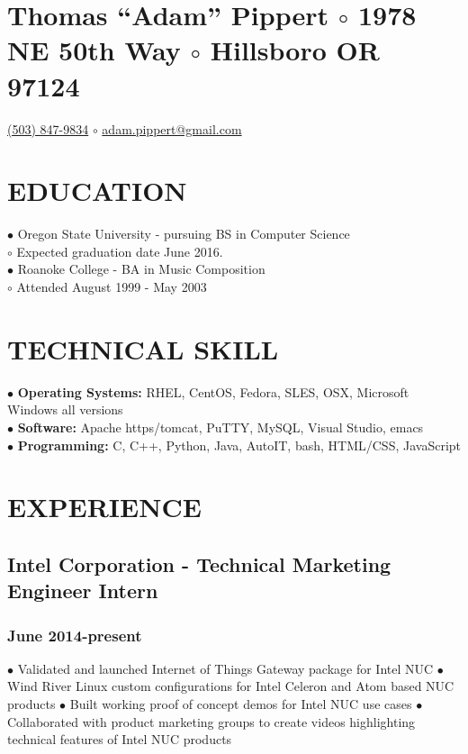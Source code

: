 \documentclass{article}
\begin{document}
\section*{Thomas ``Adam'' Pippert $\circ$
1978 NE 50th Way $\circ$
Hillsboro OR 97124}
\href{tel:+15038479834}{(503) 847-9834} $\circ$
\href{mailto:adam.pippert@gmail.com}{adam.pippert@gmail.com}

\section*{EDUCATION}

$\bullet$ Oregon State University - pursuing BS in Computer Science\\
$  \circ$ Expected graduation date June 2016.\\
$\bullet$ Roanoke College - BA in Music Composition\\
$  \circ$ Attended August 1999 - May 2003\\

\section*{TECHNICAL SKILL}

$\bullet$ \textbf{Operating Systems:} RHEL, CentOS, Fedora, SLES, OSX, Microsoft Windows all versions\\
$\bullet$ \textbf{Software:} Apache https/tomcat, PuTTY, MySQL, Visual Studio, emacs\\
$\bullet$ \textbf{Programming:} C, C++, Python, Java, AutoIT, bash, HTML/CSS, JavaScript\\

\section*{EXPERIENCE}

\subsection*{Intel Corporation - Technical Marketing Engineer Intern}
\subsubsection*{June 2014-present}

$\bullet$ Validated and launched Internet of Things Gateway package for Intel NUC
$\bullet$ Wind River Linux custom configurations for Intel Celeron and Atom based NUC products
$\bullet$ Built working proof of concept demos for Intel NUC use cases 
$\bullet$ Collaborated with product marketing groups to create videos highlighting technical features of Intel NUC products
\end{document}
